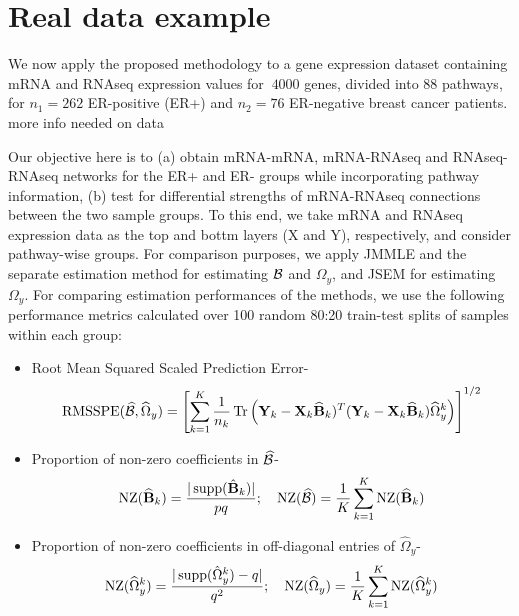 \section{Real data example}
\label{sec:secreal}
We now apply the proposed methodology to a gene expression dataset containing mRNA and RNAseq expression values for $~4000$ genes, divided into 88 pathways, for $n_1 = 262$ ER-positive (ER+) and $n_2 = 76$ ER-negative breast cancer patients. {\colrbf more info needed on data}

Our objective here is to (a) obtain mRNA-mRNA, mRNA-RNAseq and RNAseq-RNAseq networks for the ER+ and ER- groups while incorporating pathway information, (b) test for differential strengths of mRNA-RNAseq connections between the two sample groups. To this end, we take mRNA and RNAseq expression data as the top and bottm layers (X and Y), respectively, and consider pathway-wise groups. For comparison purposes, we apply JMMLE and the separate estimation method \citet{LinEtal16} for estimating ${\cal{B}}$ and $\Omega_y$, and JSEM for estimating $\Omega_y$. For comparing estimation performances of the methods, we use the following performance metrics calculated over 100 random 80:20 train-test splits of samples within each group:
%
\begin{itemize}
\item Root Mean Squared Scaled Prediction Error-
%
$$ \text{RMSSPE}(\widehat {{\cal{B}}}, \widehat \Omega_y) = \left[
\sum_{k=1}^K \frac{1}{n_k} \operatorname*{Tr} \left({\mathbf{Y}}_k - {\mathbf{X}}_k \widehat {{\mathbf{B}}}_k)^T ({\mathbf{Y}}_k - {\mathbf{X}}_k \widehat {{\mathbf{B}}}_k)
\widehat\Omega_y^k \right)
\right]^{1/2} $$

\item Proportion of non-zero coefficients in $\widehat {{\cal{B}}}$-
%
$$ \text{NZ}(\widehat {{\mathbf{B}}}_k) = \frac{| \operatorname*{supp}(\hat {{\mathbf{B}}}_k) |}{pq}; \quad
\text{NZ}(\widehat {{\cal{B}}}) = \frac{1}{K} \sum_{k=1}^K \text{NZ}(\widehat {{\mathbf{B}}}_k) $$

\item Proportion of non-zero coefficients in off-diagonal entries of $\widehat \Omega_y$-
%
$$ \text{NZ}(\widehat \Omega_y^k) = \frac{| \operatorname*{supp}(\hat \Omega_y^k) - q|}{q^2}; \quad
\text{NZ}(\widehat \Omega_y) = \frac{1}{K} \sum_{k=1}^K \text{NZ}(\widehat \Omega_y^k) $$
\end{itemize}

